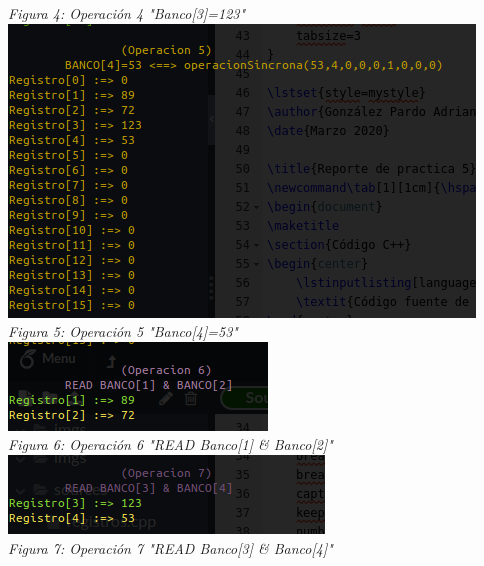 \documentclass[12pt,executivepaper]{article}
\begin{document}
\begin{center}
    \textit{Figura 4: Operación 4 "Banco[3]=123"}\\
    \includegraphics[scale=0.9]{imgs/seis.png}\\
    \textit{Figura 5: Operación 5 "Banco[4]=53"}\\
    \includegraphics[scale=1]{imgs/siete.png}\\
    \textit{Figura 6: Operación 6 "READ Banco[1] \& Banco[2]"}\\
    \includegraphics[scale=1]{imgs/ocho.png}\\
    \textit{Figura 7: Operación 7 "READ Banco[3] \& Banco[4]"}\\


\end{center}
\end{document}
